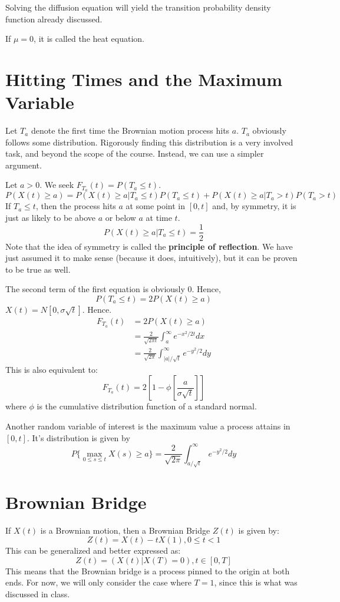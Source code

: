 \documentclass[12pt,letterpaper]{book}
\theoremstyle{definition}
\begin{document}
Solving the diffusion equation will yield the transition probability density function already discussed.

If $\mu = 0$, it is called the heat equation.

\section{Hitting Times and the Maximum Variable}

Let $T_a$ denote the first time the Brownian motion process hits $a$. $T_a$ obviously follows some distribution. Rigorously finding this distribution is a very involved task, and beyond the scope of the course. Instead, we can use a simpler argument.

Let $a > 0$. We seek $F_{T_a}(t) = P(T_a \leq t)$.
\[P(X(t) \geq a) = P(X(t) \geq a | T_a \leq t) P(T_a \leq t) + P(X(t) \geq a | T_a > t)P(T_a > t) \]
If $T_a \leq t$, then the process hits $a$ at some point in $[0,t]$ and, by symmetry, it is just as likely to be above $a$ or below $a$ at time $t$.
\[P(X(t) \geq a | T_a \leq t) = \frac{1}{2}\]
Note that the idea of symmetry is called the \textbf{principle of reflection}. We have just assumed it to make sense (because it does, intuitively), but it can be proven to be true as well. 

The second term of the first equation is obviously 0. Hence,
\[P(T_a \leq t) = 2 P(X(t) \geq a)\]
$X(t) = N[0, \sigma \sqrt t ]$. Hence.
\begin{align*}
  F_{T_a}(t) &= 2 P(X(t) \geq a)  \\
             &= \frac{2}{\sqrt{2 \pi t}} \int_{a}^{\infty} e^{-x^2/2t}dx \\
             &= \frac{2}{\sqrt{2 \pi}} \int_{|a|/\sqrt{t}}^{\infty} e^{-y^2/2}dy 
\end{align*}
This is also equivalent to:
\[F_{T_a}(t) = 2 \left[ 1 - \phi \left[ \frac{a}{\sigma \sqrt{t}}\right]\right]\]
where $\phi$ is the cumulative distribution function of a standard normal.

Another random variable of interest is the maximum value a process attains in $[0,t]$. It's distribution is given by
\[P \{\max_{0 \leq s \leq t} X(s) \geq a\} = \frac{2}{\sqrt{2 \pi}} \int_{a/\sqrt{t}}^{\infty} e^{-y^2/2} dy\]

\section{Brownian Bridge}

If $X(t)$ is a Brownian motion, then a Brownian Bridge $Z(t)$ is given by:
\[Z(t) = X(t) - tX(1), 0 \leq t < 1\]
This can be generalized and better expressed as:
\[Z(t) = (X(t) | X(T) = 0), t \in [0,T]\]
This means that the Brownian bridge is a process pinned to the origin at both ends. For now, we will only consider the case where $T=1$, since this is what was discussed in class.
\end{document}
